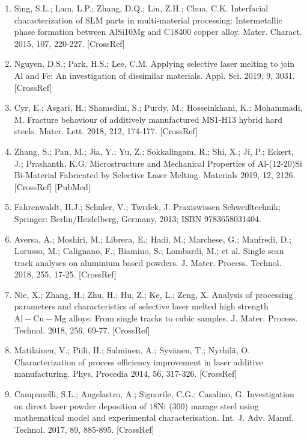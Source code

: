 \documentclass[10pt]{article}
\begin{document}
\begin{enumerate}
  \item Sing, S.L.; Lam, L.P.; Zhang, D.Q.; Liu, Z.H.; Chua, C.K. Interfacial characterization of SLM parts in multi-material processing: Intermetallic phase formation between AlSi10Mg and C18400 copper alloy. Mater. Charact. 2015, 107, 220-227. [CrossRef]

  \item Nguyen, D.S.; Park, H.S.; Lee, C.M. Applying selective laser melting to join Al and Fe: An investigation of dissimilar materials. Appl. Sci. 2019, 9, 3031. [CrossRef]

  \item Cyr, E.; Asgari, H.; Shamsdini, S.; Purdy, M.; Hosseinkhani, K.; Mohammadi, M. Fracture behaviour of additively manufactured MS1-H13 hybrid hard steels. Mater. Lett. 2018, 212, 174-177. [CrossRef]

  \item Zhang, S.; Pan, M.; Jia, Y.; Yu, Z.; Sokkalingam, R.; Shi, X.; Ji, P.; Eckert, J.; Prashanth, K.G. Microstructure and Mechanical Properties of Al-(12-20)Si Bi-Material Fabricated by Selective Laser Melting. Materials 2019, 12, 2126. [CrossRef] [PubMed]

  \item Fahrenwaldt, H.J.; Schuler, V.; Twrdek, J. Praxiswissen Schweißtechnik; Springer: Berlin/Heidelberg, Germany, 2013; ISBN 9783658031404.

  \item Aversa, A.; Moshiri, M.; Librera, E.; Hadi, M.; Marchese, G.; Manfredi, D.; Lorusso, M.; Calignano, F.; Biamino, S.; Lombardi, M.; et al. Single scan track analyses on aluminium based powders. J. Mater. Process. Technol. 2018, 255, 17-25. [CrossRef]

  \item Nie, X.; Zhang, H.; Zhu, H.; Hu, Z.; Ke, L.; Zeng, X. Analysis of processing parameters and characteristics of selective laser melted high strength $\mathrm{Al}-\mathrm{Cu}-\mathrm{Mg}$ alloys: From single tracks to cubic samples. J. Mater. Process. Technol. 2018, 256, 69-77. [CrossRef]

  \item Matilainen, V.; Piili, H.; Salminen, A.; Syvänen, T.; Nyrhilä, O. Characterization of process efficiency improvement in laser additive manufacturing. Phys. Procedia 2014, 56, 317-326. [CrossRef]

  \item Campanelli, S.L.; Angelastro, A.; Signorile, C.G.; Casalino, G. Investigation on direct laser powder deposition of $18 \mathrm{Ni}$ (300) marage steel using mathematical model and experimental characterisation. Int. J. Adv. Manuf. Technol. 2017, 89, 885-895. [CrossRef]

\end{enumerate}
\end{document}
